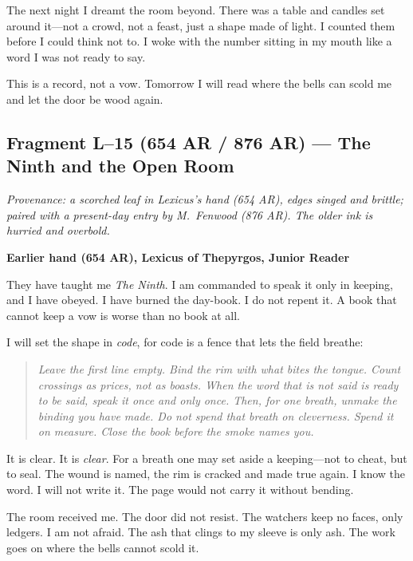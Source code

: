 \documentclass[11pt]{article}
\begin{document}
The next night I dreamt the room beyond. There was a table and candles set around it—not a crowd, not a feast, just a shape made of light. I counted them before I could think not to. I woke with the number sitting in my mouth like a word I was not ready to say.

This is a record, not a vow. Tomorrow I will read where the bells can scold me and let the door be wood again.

\subsection{Fragment L--15 (654 AR / 876 AR) --- The Ninth and the Open Room}
\label{frag:l15}
{}

\noindent\textit{Provenance: a scorched leaf in Lexicus’s hand (654 AR), edges singed and brittle; paired with a present-day entry by M.\ Fenwood (876 AR). The older ink is hurried and overbold.}

\medskip
\noindent\textbf{Earlier hand (654 AR), Lexicus of Thepyrgos, Junior Reader}

They have taught me \emph{The Ninth}. I am commanded to speak it only in keeping, and I have obeyed. I have burned the day-book. I do not repent it. A book that cannot keep a vow is worse than no book at all.

I will set the shape in \emph{code}, for code is a fence that lets the field breathe:

\begin{quote}\small
\textit{Leave the first line empty. Bind the rim with what bites the tongue. Count crossings as prices, not as boasts. When the word that is not said is ready to be said, speak it once and only once. Then, for one breath, unmake the binding you have made. Do not spend that breath on cleverness. Spend it on measure. Close the book before the smoke names you.}
\end{quote}

It is clear. It is \emph{clear}. For a breath one may set aside a keeping—not to cheat, but to seal. The wound is named, the rim is cracked and made true again. I know the word. I will not write it. The page would not carry it without bending.

The room received me. The door did not resist. The watchers keep no faces, only ledgers. I am not afraid. The ash that clings to my sleeve is only ash. The work goes on where the bells cannot scold it.
\end{document}
